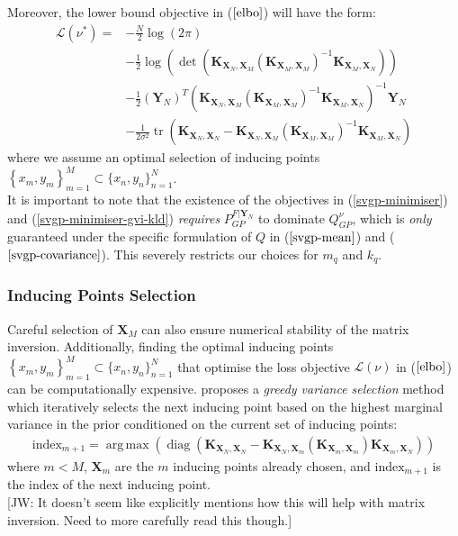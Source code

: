 \documentclass{article}
\newcommand{\jw}[1]{{\color{gray} [JW: #1]}}
\newcommand{\tr}{\operatorname{tr}}
\newcommand{\diag}{\operatorname{diag}}
\DeclareMathOperator*{\argmax}{arg\,max}
\numberwithin{equation}{section}
\begin{document}
Moreover, the lower bound objective in ($\ref{elbo}$) will have the form:
\begin{align}
    \label{svgp-optimal-elbo}
    \mathcal{L}(\nu^*) = &-\frac{N}{2} \log\left(2\pi \right)\\
    &-\frac{1}{2} \log \left(\det\left( \mathbf{K}_{\mathbf{X}_N, \mathbf{X}_M}\left(\mathbf{K}_{\mathbf{X}_M, \mathbf{X}_M}\right)^{-1} \mathbf{K}_{\mathbf{X}_M, \mathbf{X}_N}\right)\right)\\
    & -\frac{1}{2} \left(\mathbf{Y}_N\right)^T \left( \mathbf{K}_{\mathbf{X}_N, \mathbf{X}_M}\left(\mathbf{K}_{\mathbf{X}_M, \mathbf{X}_M}\right)^{-1} \mathbf{K}_{\mathbf{X}_M, \mathbf{X}_N}\right)^{-1} \mathbf{Y}_N \\
    &  - \frac{1}{2\sigma^2}\tr\left(\mathbf{K}_{\mathbf{X}_N, \mathbf{X}_N} - \mathbf{K}_{\mathbf{X}_N, \mathbf{X}_M}\left(\mathbf{K}_{\mathbf{X}_M, \mathbf{X}_M}\right)^{-1} \mathbf{K}_{\mathbf{X}_M, \mathbf{X}_N}\right)
\end{align}
where we assume an optimal selection of inducing points $\left\{x_m, y_m\right\}_{m=1}^{M} \subset \{x_n, y_n\}_{n=1}^{N}$.
\\It is important to note that the existence of the objectives in (\ref{svgp-minimiser}) and (\ref{svgp-minimiser-gvi-kld}) \textit{requires} $P_{GP}^{F \vert \mathbf{Y}_N}$ to dominate $Q_{GP}^{\nu}$, which is \textit{only} guaranteed under the specific formulation of $Q$ in ($\ref{svgp-mean}$) and ($\ref{svgp-covariance}$). This severely restricts our choices for $m_q$ and $k_q$.

\subsubsection{Inducing Points Selection}
Careful selection of $\mathbf{X}_M$ can also ensure numerical stability of the matrix inversion. Additionally, finding the optimal inducing points $\left\{x_m, y_m\right\}_{m=1}^{M} \subset \{x_n, y_n\}_{n=1}^{N}$ that optimise the loss objective $\mathcal{L}(\nu)$ in ($\ref{elbo}$) can be computationally expensive. \cite{burt2020convergence} proposes a \textit{greedy variance selection} method which iteratively selects the next inducing point based on the highest marginal variance in the prior conditioned on the current set of inducing points:
\begin{align}
    \label{greedy-varaince-selection}
    \text{index}_{m+1} = \argmax \left(\diag \left(\mathbf{K}_{\mathbf{X}_N, \mathbf{X}_N} - \mathbf{K}_{\mathbf{X}_N, \mathbf{X}_{m}} \left(\mathbf{K}_{\mathbf{X}_{m}, \mathbf{X}_{m}} \right) \mathbf{K}_{\mathbf{X}_{m}, \mathbf{X}_N}\right)\right)
\end{align}
where $m < M$, $\mathbf{X}_{m}$ are the $m$ inducing points already chosen, and $\text{index}_{m+1}$ is the index of the next inducing point.
\\\jw{It doesn't seem like \cite{burt2020convergence} explicitly mentions how this will help with matrix inversion. Need to more carefully read this though.}
\end{document}

